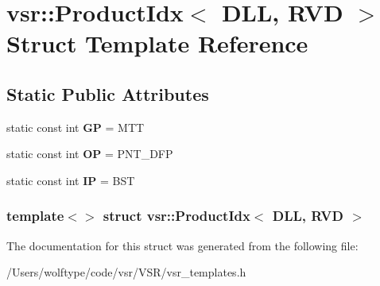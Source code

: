 \hypertarget{structvsr_1_1_product_idx_3_01_d_l_l_00_01_r_v_d_01_4}{\section{vsr\-:\-:Product\-Idx$<$ D\-L\-L, R\-V\-D $>$ Struct Template Reference}
\label{structvsr_1_1_product_idx_3_01_d_l_l_00_01_r_v_d_01_4}
}
\subsection*{Static Public Attributes}
\begin{DoxyCompactItemize}
\item 
\hypertarget{structvsr_1_1_product_idx_3_01_d_l_l_00_01_r_v_d_01_4_a87f8094abf4d3e90b0ad59dae683b6e0}{static const int {\bfseries G\-P} = M\-T\-T}\label{structvsr_1_1_product_idx_3_01_d_l_l_00_01_r_v_d_01_4_a87f8094abf4d3e90b0ad59dae683b6e0}

\item 
\hypertarget{structvsr_1_1_product_idx_3_01_d_l_l_00_01_r_v_d_01_4_a128fc9ff8b221710a90b5e2a7d6347d6}{static const int {\bfseries O\-P} = P\-N\-T\-\_\-\-D\-F\-P}\label{structvsr_1_1_product_idx_3_01_d_l_l_00_01_r_v_d_01_4_a128fc9ff8b221710a90b5e2a7d6347d6}

\item 
\hypertarget{structvsr_1_1_product_idx_3_01_d_l_l_00_01_r_v_d_01_4_abf5b6dbf74955c1e68e880b5fb2c6c23}{static const int {\bfseries I\-P} = B\-S\-T}\label{structvsr_1_1_product_idx_3_01_d_l_l_00_01_r_v_d_01_4_abf5b6dbf74955c1e68e880b5fb2c6c23}

\end{DoxyCompactItemize}
\subsubsection*{template$<$$>$ struct vsr\-::\-Product\-Idx$<$ D\-L\-L, R\-V\-D $>$}



The documentation for this struct was generated from the following file\-:\begin{DoxyCompactItemize}
\item 
/\-Users/wolftype/code/vsr/\-V\-S\-R/vsr\-\_\-templates.\-h\end{DoxyCompactItemize}
